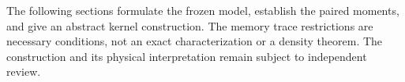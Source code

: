 The following sections formulate the frozen model, establish the paired moments, and give an abstract kernel construction. The memory trace restrictions are necessary conditions, not an exact characterization or a density theorem. The construction and its physical interpretation remain subject to independent review.
